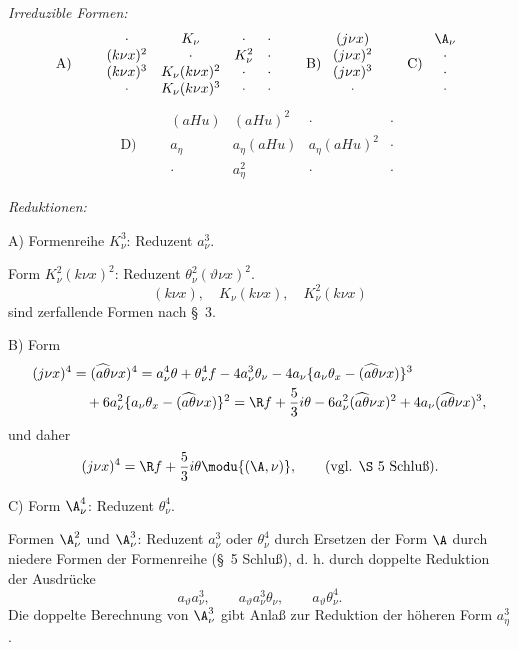\noindent\emph{Irreduzible Formen:}
\[
\begin{array}{c@{\qquad}c@{\qquad}c@{\qquad}c}
\text{A)} & \begin{array}{cccc}
\cdot&K_\nu&\cdot&\cdot\\
(k\nu x)^2&\cdot&K_\nu^2&\cdot\\
(k\nu x)^3&K_\nu(k\nu x)^2&\cdot&\cdot\\
\cdot&K_\nu(k\nu x)^3&\cdot&\cdot
\end{array}
&
\text{B)}\ \begin{array}{c}(j\nu x)\\(j\nu x)^2\\(j\nu x)^3\\ \cdot\end{array}
&
\text{C)}\ \begin{array}{c}\A_\nu\\\cdot\\\cdot\\\cdot\end{array}
\end{array}
\]
\[
\text{D)}\qquad
\begin{array}{cccc}
(aHu)&(aHu)^2&\cdot&\cdot\\
a_\eta&a_\eta(aHu)&a_\eta(aHu)^2&\cdot\\
\cdot&a_\eta^2&\cdot&\cdot
\end{array}
\]

\noindent\emph{Reduktionen:}

\noindent A) Formenreihe $K_\nu^3$: Reduzent $a_\nu^3$.

Form $K_\nu^2(k\nu x)^2$: Reduzent $\theta_\nu^2(\vartheta\nu x)^2$.
\[
(k\nu x),\quad K_\nu(k\nu x),\quad K_\nu^2(k\nu x)
\]
sind zerfallende Formen nach \S\ 3.

\noindent B) Form
\[
\begin{aligned}
(j\nu x)^4&=(\widehat{a\theta}\nu x)^4
=a_\nu^4\theta+\theta_\nu^4 f-4a_\nu^3\theta_\nu
-4a_\nu\{a_\nu\theta_x-(\widehat{a\theta}\nu x)\}^3\\
&\quad+6a_\nu^2\{a_\nu\theta_x-(\widehat{a\theta}\nu x)\}^2
=\R f+\frac53 i\theta-6a_\nu^2(\widehat{a\theta}\nu x)^2
+4a_\nu(\widehat{a\theta}\nu x)^3,
\end{aligned}
\]
und daher
\[
(j\nu x)^4=\R f+\frac53 i\theta\modu{(\A,\nu)},\qquad (\text{vgl. \S\ 5 Schluß}).
\]

\noindent C) Form $\A_\nu^4$: Reduzent $\theta_\nu^4$.

Formen $\A_\nu^2$ und $\A_\nu^3$: Reduzent $a_\nu^3$ oder $\theta_\nu^4$ durch Ersetzen der Form $\A$ durch niedere Formen der Formenreihe (\S\ 5 Schluß), d. h. durch doppelte Reduktion der Ausdrücke
\[
a_\vartheta a_\nu^3,\qquad
a_\vartheta a_\nu^3\theta_\nu,\qquad
a_\vartheta\theta_\nu^4.
\]
Die doppelte Berechnung von $\A_\nu^3$ gibt Anlaß zur Reduktion der höheren Form $a_\eta^3$.

